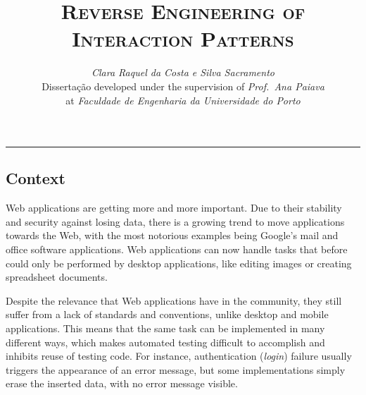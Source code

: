 \documentclass[9pt,a4paper]{extarticle}
\begin{document}
\title{\vspace*{-8mm}\textbf{\textsc{Reverse Engineering of Interaction Patterns}}}
\author{\emph{Clara Raquel da Costa e Silva Sacramento}\\[2mm]
\small{Dissertação developed under the supervision of \emph{Prof.\ Ana Paiava}}\\
\small{at \emph{Faculdade de Engenharia da Universidade do Porto}}}
\date{}
\maketitle
\thispagestyle{empty}

\vspace*{-4mm}\noindent\rule{\textwidth}{0.4pt}\vspace*{4mm}

\begin{multicols}{2}

\section{Context}\label{sec:context}


Web applications are getting more and more important. Due to their stability and security against losing data, there is a growing trend to move applications towards the Web, with the most notorious examples being Google's mail and office software applications. Web applications can now handle tasks that before could only be performed by desktop applications, like editing images or creating spreadsheet documents.

Despite the relevance that Web applications have in the community, they still suffer from a lack of standards and conventions, unlike desktop and mobile applications. This means that the same task can be implemented in many different ways, which makes automated testing difficult to accomplish and inhibits reuse of testing code. For instance, authentication (\textit{login}) failure usually triggers the appearance of an error message, but some implementations simply erase the inserted data, with no error message visible.


\end{multicols}
\end{document}
